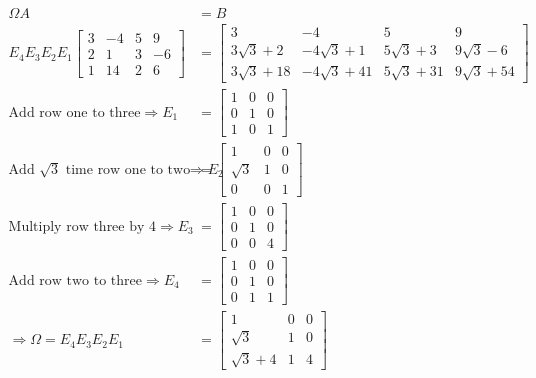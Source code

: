 \documentclass[11pt]{homework}
\begin{document}
\begin{align*}
\Omega A &= B \\
E_4 E_3 E_2 E_1
  \begin{bmatrix}
  3 & -4 & 5 & 9 \\
  2 & 1 & 3 & -6 \\
  1 & 14 & 2 & 6 
  \end{bmatrix}
  &=
  \begin{bmatrix}
  3 & -4 & 5 & 9 \\
  3\sqrt{3}+2 & -4 \sqrt{3} +1 & 5 \sqrt{3} +3 & 9 \sqrt{3} -6 \\
  3\sqrt{3}+18 & -4 \sqrt{3} +41 & 5 \sqrt{3} +31 & 9 \sqrt{3} +54
  \end{bmatrix} \\
\text{Add row one to three}
\Rightarrow 
E_1 &= 
  \begin{bmatrix}
  1 & 0 & 0  \\
  0 & 1 & 0  \\
  1 & 0 & 1
  \end{bmatrix} \\
\text{Add $\sqrt{3}$ time row one to two}
\Rightarrow 
E_2 &= 
  \begin{bmatrix}
  1 & 0 & 0  \\
  \sqrt{3} & 1 & 0  \\
  0 & 0 & 1
  \end{bmatrix} \\
\text{Multiply row three by 4}
\Rightarrow 
E_3 &= 
  \begin{bmatrix}
  1 & 0 & 0  \\
  0 & 1 & 0  \\
  0 & 0 & 4
  \end{bmatrix} \\
\text{Add row two to three}
\Rightarrow 
E_4 &= 
  \begin{bmatrix}
  1 & 0 & 0  \\
  0 & 1 & 0  \\
  0 & 1 & 1
  \end{bmatrix} \\
\Rightarrow 
\Omega = E_4 E_3 E_2 E_1 &=
  \begin{bmatrix}
  1 & 0 & 0  \\
  \sqrt{3} & 1 & 0  \\
  \sqrt{3}+4 & 1 & 4
  \end{bmatrix} 
\end{align*}
\end{document}
